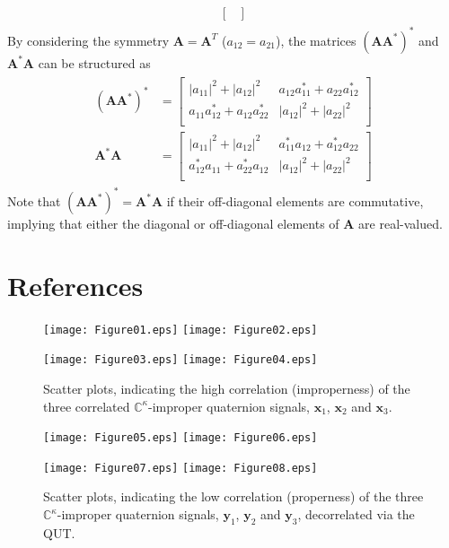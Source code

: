\documentclass[review]{elsarticle}
\theoremstyle{plain}
\theoremstyle{remark}
\theoremstyle{plain}
\theoremstyle{definition}
\theoremstyle{prop}
\theoremstyle{definition}
\theoremstyle{plain}
\theoremstyle{plain}
\begin{document}
\begin{appendices}
\begin{align*}
\begin{split}
\begin{bmatrix}
\end{bmatrix}
\end{split}
\end{align*}
By considering the symmetry $\mathbf{A}=\mathbf{A}^T$ ($a_{12}=a_{21}$), the matrices $(\mathbf{A}\mathbf{A}^*)^*$ and $\mathbf{A}^*\mathbf{A}$ can be structured as \\
\vspace{-2mm}\begin{align*}
\begin{split}
(\mathbf{A}\mathbf{A}^*)^* &=\begin{bmatrix}
|a_{11}|^2+|a_{12}|^2 & a_{12}a_{11}^*+a_{22}a_{12}^* \\
a_{11}a_{12}^*+a_{12}a_{22}^* & |a_{12}|^2+|a_{22}|^2 \\
\end{bmatrix} \\
\mathbf{A}^*\mathbf{A}~
&=\begin{bmatrix}
|a_{11}|^2+|a_{12}|^2 & a_{11}^*a_{12}+a_{12}^*a_{22} \\
a_{12}^*a_{11}+a_{22}^*a_{12} & |a_{12}|^2+|a_{22}|^2 \\
\end{bmatrix}
\end{split}
\end{align*}
\noindent Note that $(\mathbf{A}\mathbf{A}^*)^*=\mathbf{A}^*\mathbf{A}$ if their off-diagonal elements are commutative, implying that either the diagonal or off-diagonal elements of $\mathbf{A}$ are real-valued.
\end{appendices}
\section*{References} 


\newpage
\begin{figure}[h]
\centering
\subfloat
{\texttt{[image: Figure01.eps]}}
\subfloat
{\texttt{[image: Figure02.eps]}}

\subfloat
{\texttt{[image: Figure03.eps]}}
\subfloat
{\texttt{[image: Figure04.eps]}}
\caption{\label{fig:QUT1}Scatter plots, indicating the high correlation (improperness) of the three correlated $\mathbb{C}^\kappa$-improper quaternion signals, $\mathbf{x}_1$, $\mathbf{x}_2$ and $\mathbf{x}_3$.}
\end{figure}
\begin{figure}[h]
\centering
\subfloat
{\texttt{[image: Figure05.eps]}}
\subfloat
{\texttt{[image: Figure06.eps]}}

\subfloat
{\texttt{[image: Figure07.eps]}}
\subfloat
{\texttt{[image: Figure08.eps]}}
\caption{\label{fig:QUT2}Scatter plots, indicating the low correlation (properness) of the three $\mathbb{C}^\kappa$-improper quaternion signals, $\mathbf{y}_1$, $\mathbf{y}_2$ and $\mathbf{y}_3$, decorrelated via the QUT.}
\end{figure}
\end{document}
